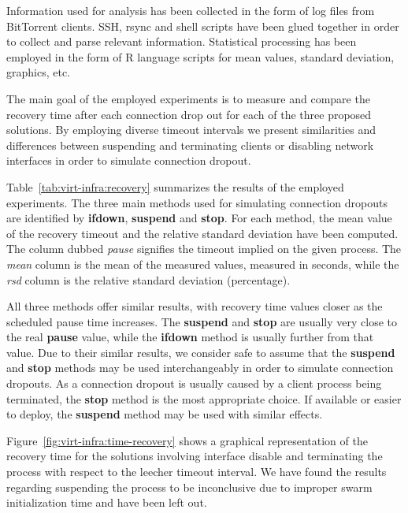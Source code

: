 Information used for analysis has been collected in the form of log files from
BitTorrent clients. SSH, rsync and shell scripts have been glued together in
order to collect and parse relevant information. Statistical processing has
been employed in the form of R language scripts for mean values, standard
deviation, graphics, etc.

The main goal of the employed experiments is to measure and compare the
recovery time after each connection drop out for each of the three proposed
solutions. By employing diverse timeout intervals we present similarities and
differences between suspending and terminating clients or disabling network
interfaces in order to simulate connection dropout.



Table~\ref{tab:virt-infra:recovery} summarizes the results of the employed
experiments.  The three main methods used for simulating connection dropouts
are identified by \textbf{ifdown}, \textbf{suspend} and \textbf{stop}. For
each method, the mean value of the recovery timeout and the relative standard
deviation have been computed. The column dubbed \textit{pause} signifies the
timeout implied on the given process. The \textit{mean} column is the mean of
the measured values, measured in seconds, while the \textit{rsd} column is the
relative standard deviation (percentage).

All three methods offer similar results, with recovery time values closer
as the scheduled pause time increases. The \textbf{suspend} and \textbf{stop}
are usually very close to the real \textbf{pause} value, while the
\textbf{ifdown} method is usually further from that value. Due to their
similar results, we consider safe to assume that the \textbf{suspend} and
\textbf{stop} methods may be used interchangeably in order to simulate
connection dropouts. As a connection dropout is usually caused by a client
process being terminated, the \textbf{stop} method is the most appropriate
choice. If available or easier to deploy, the \textbf{suspend} method may be
used with similar effects.

Figure~\ref{fig:virt-infra:time-recovery} shows a graphical representation of
the recovery time for the solutions involving interface disable and
terminating the process with respect to the leecher timeout interval. We have
found the results regarding suspending the process to be inconclusive due to
improper swarm initialization time and have been left out.

